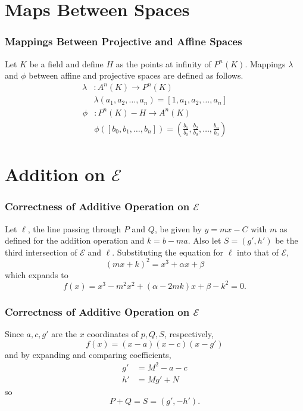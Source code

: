 \documentclass{beamer}
\begin{document}
    \section{Maps Between Spaces}
    \begin{frame}
        \frametitle{Mappings Between Projective and Affine Spaces}
        Let \(K\) be a field and define \(H\) as the points at infinity
        of \(P^n(K)\). Mappings \(\lambda\) and \(\phi\) between
        affine and projective spaces are defined as follows.
        \begin{align*}
            \lambda&: A^n(K) \to P^n(K) \\
            &\lambda(a_1, a_2, \dots, a_n) = [1, a_1, a_2, \dots, a_n]
        \end{align*}
        \begin{align*}
            \phi&: P^n(K) - H \to A^n(K) \\
            &\phi([b_0, b_1, \dots, b_n]) =
                \left(\frac{b_1}{b_0}, \frac{b_2}{b_0}, \dots,
                \frac{b_n}{b_0}\right)
        \end{align*}
    \end{frame}

    \section{Addition on \(\mathcal{E}\)}
    \begin{frame}[label=add]
        \frametitle{Correctness of Additive Operation on \(\mathcal{E}\)}
        Let \(\ell\), the line passing through \(P\) and \(Q\), be given by
        \(y = mx - C\) with \(m\) as defined for the addition
        operation and \(k = b - ma\). Also let \(S = (g', h')\) be the third
        intersection of
        \(\mathcal{E}\) and \(\ell\). Substituting the equation for \(\ell\)
        into that of \(\mathcal{E}\),
        \[(mx + k)^2 = x^3 + \alpha x + \beta\] which expands to
        \[f(x) = x^3 - m^2x^2 + (\alpha - 2mk)x + \beta - k^2 = 0.\]
    \end{frame}
    \begin{frame}
        \frametitle{Correctness of Additive Operation on \(\mathcal{E}\)}
        Since \(a, c, g'\) are the \(x\) coordinates of \(p, Q, S\),
        respectively,
        \[f(x) = (x - a)(x - c)(x - g')\]
        and by expanding and comparing coefficients,
        \begin{align*}
            g' &= M^2 - a - c \\
            h' &= Mg' + N
        \end{align*}
        so
        \[P + Q = S = (g', -h').\]
    \end{frame}
\end{document}
